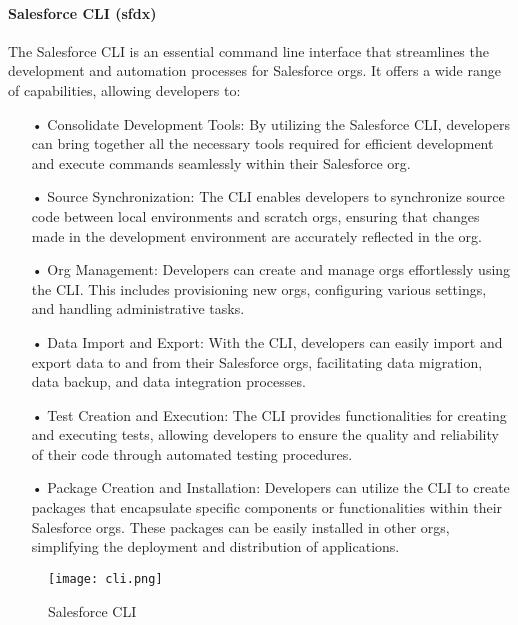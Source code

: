 \paragraph*{Salesforce CLI (sfdx)}
The Salesforce CLI is an essential command line interface that streamlines the development and automation processes for Salesforce orgs. It offers a wide range of capabilities, allowing developers to:
\begin{itemize}

\item[•] Consolidate Development Tools: By utilizing the Salesforce CLI, developers can bring together all the necessary tools required for efficient development and execute commands seamlessly within their Salesforce org.

\item[•] Source Synchronization: The CLI enables developers to synchronize source code between local environments and scratch orgs, ensuring that changes made in the development environment are accurately reflected in the org.

\item[•] Org Management: Developers can create and manage orgs effortlessly using the CLI. This includes provisioning new orgs, configuring various settings, and handling administrative tasks.

\item[•] Data Import and Export: With the CLI, developers can easily import and export data to and from their Salesforce orgs, facilitating data migration, data backup, and data integration processes.

\item[•] Test Creation and Execution: The CLI provides functionalities for creating and executing tests, allowing developers to ensure the quality and reliability of their code through automated testing procedures.

\item[•] Package Creation and Installation: Developers can utilize the CLI to create packages that encapsulate specific components or functionalities within their Salesforce orgs. These packages can be easily installed in other orgs, simplifying the deployment and distribution of applications.
\end{itemize}

\begin{figure}[H]%
    \center   
    \texttt{[image: cli.png]}
    \caption{Salesforce CLI}
\end{figure}

